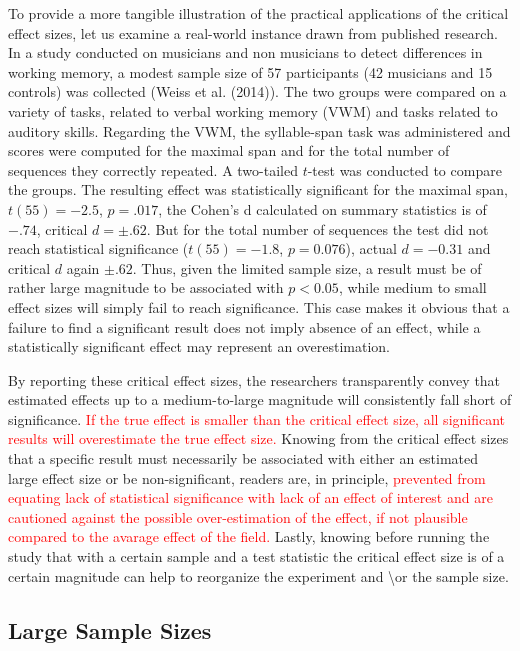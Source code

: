 \documentclass[
  man]{apa7}
\begin{document}
To provide a more tangible illustration of the practical applications of the critical effect sizes, let us examine a real-world instance drawn from published research. In a study conducted on musicians and non musicians to detect differences in working memory, a modest sample size of 57 participants (42 musicians and 15 controls) was collected (Weiss et al. (2014)). The two groups were compared on a variety of tasks, related to verbal working memory (VWM) and tasks related to auditory skills. Regarding the VWM, the syllable-span task was administered and scores were computed for the maximal span and for the total number of sequences they correctly repeated. A two-tailed \(t\)-test was conducted to compare the groups. The resulting effect was statistically significant for the maximal span, \(t(55) = -2.5\), \(p = .017\), the Cohen's d calculated on summary statistics is of \(-.74\), critical \(d = \pm .62\). But for the total number of sequences the test did not reach statistical significance (\(t(55) = -1.8\), \(p = 0.076\)), actual \(d = -0.31\) and critical \(d\) again \(\pm.62\). Thus, given the limited sample size, a result must be of rather large magnitude to be associated with \(p < 0.05\), while medium to small effect sizes will simply fail to reach significance. This case makes it obvious that a failure to find a significant result does not imply absence of an effect, while a statistically significant effect may represent an overestimation.

By reporting these critical effect sizes, the researchers transparently convey that estimated effects up to a medium-to-large magnitude will consistently fall short of significance. \textcolor{red}{If the true effect is smaller than the critical effect size, all significant results will overestimate the true effect size.} Knowing from the critical effect sizes that a specific result must necessarily be associated with either an estimated large effect size or be non-significant, readers are, in principle, \textcolor{red}{prevented from equating lack of statistical significance with lack of an effect of interest and are cautioned against the possible over-estimation of the effect, if not plausible compared to the avarage effect of the field.} Lastly, knowing before running the study that with a certain sample and a test statistic the critical effect size is of a certain magnitude can help to reorganize the experiment and \backslash or the sample size.

\hypertarget{large-sample-sizes}{%
\subsection{Large Sample Sizes}\label{large-sample-sizes}}
\end{document}
